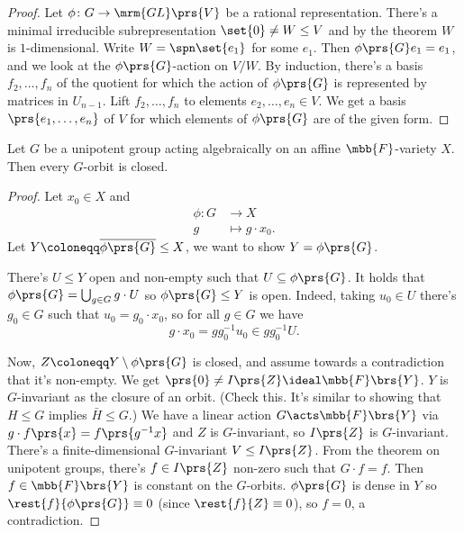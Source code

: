 \documentclass[10pt,a4paper,twoside,openany,hidelinks]{book}
\begin{document}
\begin{proof}
Let $\phi \colon G \to \mrm{GL}\prs{V}$ be a rational representation.
There's a minimal irreducible subrepresentation $\set{0} \neq W \leq V$ and by the theorem $W$ is $1$-dimensional. Write $W = \spn\set{e_1}$ for some $e_1$. Then $\phi\prs{G} e_1 = e_1$, and we look at the $\phi\prs{G}$-action on $V/W$. By induction, there's a basis $f_2, \ldots, f_n$ of the quotient for which the action of $\phi\prs{G}$ is represented by matrices in $U_{n-1}$. Lift $f_2, \ldots, f_n$ to elements $e_2, \ldots, e_n \in V$. We get a basis $\prs{e_1, \ldots, e_n}$ of $V$ for which elements of $\phi\prs{G}$ are of the given form.
\end{proof}

\begin{proposition}
Let $G$ be a unipotent group acting algebraically on an affine $\mbb{F}$-variety $X$. %
Then every $G$-orbit is closed.
\end{proposition}

\begin{proof}
Let $x_0 \in X$ and
\begin{align*}
\phi \colon G &\to X \\
g &\mapsto g \cdot x_0 \text{.}
\end{align*}
Let $Y \coloneqq \overline{\phi\prs{G}} \leq X$, we want to show $Y = \phi\prs{G}$.

There's $U \leq Y$ open and non-empty such that $U \subseteq \phi\prs{G}$.
It holds that $\phi\prs{G} = \bigcup_{g \in G} g \cdot U$ so $\phi\prs{G} \leq Y$ is open.
Indeed, taking $u_0 \in U$ there's $g_0 \in G$ such that $u_0 = g_0 \cdot x_0$, so for all $g \in G$ we have
\[g \cdot x_0 = g g_0^{-1} u_0 \in g g_0^{-1} U \text{.}\]

Now, $Z \coloneqq Y \setminus \phi\prs{G}$ is closed, and assume towards a contradiction that it's non-empty.
We get $\prs{0} \neq I\prs{Z} \ideal \mbb{F}\brs{Y}$.
$Y$ is $G$-invariant as the closure of an orbit. (Check this. It's similar to showing that $H \leq G$ implies $\bar{H} \leq G$.)
We have a linear action $G \acts \mbb{F}\brs{Y}$ via $g \cdot f\prs{x} = f\prs{g^{-1}x}$ and $Z$ is $G$-invariant, so $I\prs{Z}$ is $G$-invariant. There's a finite-dimensional $G$-invariant $V \leq I\prs{Z}$. 
From the theorem on unipotent groups, there's $f \in I\prs{Z}$ non-zero such that $G \cdot f = f$. %
Then $f \in \mbb{F}\brs{Y}$ is constant on the $G$-orbits.
$\phi\prs{G}$ is dense in $Y$ so $\rest{f}{\phi\prs{G}} \equiv 0$ (since $\rest{f}{Z} \equiv 0$), so $f = 0$, a contradiction.
\end{proof}
\end{document}
